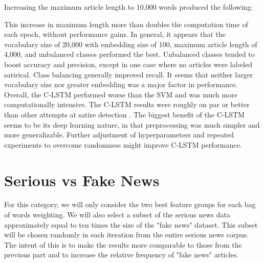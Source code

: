 \documentclass [12 pt] {report}
\begin{document}
Increasing the maximum article length to 10,000 words produced the following:
\vspace*{-2mm}
\begin{table}[H]
\small
{}
\label{table:C-LSTM Results2}
\end{table}
This increase in maximum length more than doubles the computation time of each epoch, without performance gains. In general, it appears that the vocabulary size of 20,000 with embedding size of 100, maximum article length of 4,000, and unbalanced classes performed the best. Unbalanced classes tended to boost accuracy and precision, except in one case where no articles were labeled satirical. Class balancing generally improved recall. It seems that neither larger vocabulary size nor greater embedding was a major factor in performance. Overall, the C-LSTM performed worse than the SVM and was much more computationally intensive. The C-LSTM results were roughly on par or better than other attempts at satire detection \cite{Burfoot}\cite{Yang}. The biggest benefit of the C-LSTM seems to be its deep learning nature, in that preprocessing was much simpler and more generalizable. Further adjustment of hyperparameters and repeated experiments to overcome randomness might improve C-LSTM performance.

\section{Serious vs Fake News}
For this category, we will only consider the two best feature groups for each bag of words weighting. We will also select a subset of the serious news data approximately equal to ten times the size of the "fake news" dataset. This subset will be chosen randomly in each iteration from the entire serious news corpus. The intent of this is to make the results more comparable to those from the previous part and to increase the relative frequency of "fake news" articles.
\end{document}
